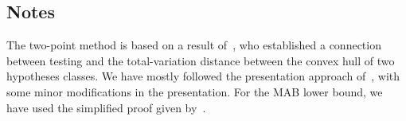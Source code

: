 \documentclass[12pt]{article}
\begin{document}
\subsection*{Notes}
{\small

The two-point method is based on a result of~\citet{lecam1973convergence}, who established a connection between testing and the total-variation distance between the convex hull of two hypotheses classes. We have mostly followed the presentation approach of~\citet[Chapter 2]{tsybakov2009nonparametric}, with some minor modifications in the presentation. 
For the MAB lower bound, we have used the simplified proof given by~\citet[Chapter 15]{lattimore2020bandit}. 
}

\end{document}
